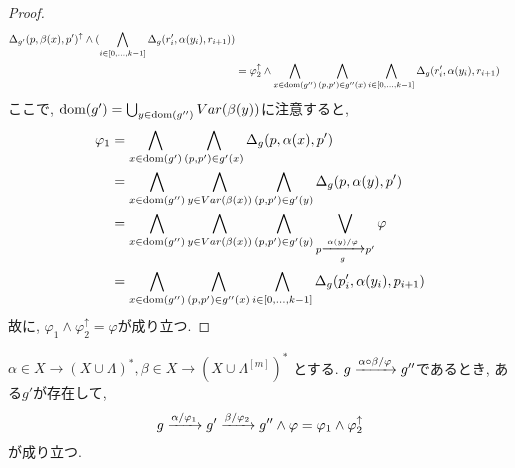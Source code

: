 \documentclass[uplatex,dvipdfmx,a4j]{jsreport}
\begin{document}
\begin{proof}
\begin{align*}
                    \Delta_{g'}(p, \beta(x), p')^\uparrow \land
                    (\bigwedge_{i \in [0, \ldots, k - 1]} \Delta_g(r'_i, \alpha(y_i), r_{i + 1})
                  ) \\
              &= \varphi_2^\uparrow \land
                  \bigwedge_{x \in \scriptsize \dom(g'')} \bigwedge_{(p, p') \in g''(x)}
                    \bigwedge_{i \in [0, \ldots, k - 1]} \Delta_g(r'_i, \alpha(y_i), r_{i + 1})
    \end{align*}
    ここで, $\dom(g') = \bigcup_{y \in \scriptsize \dom(g'')} Var(\beta(y))$に注意すると,
    \begin{align*}
      \varphi_1 &= \bigwedge_{x \in \scriptsize \dom(g')} \bigwedge_{(p, p') \in g'(x)}
                  \Delta_g(p, \alpha(x), p')  \\
                &= \bigwedge_{x \in \scriptsize \dom(g'')} \bigwedge_{y \in Var(\beta(x))}
                  \bigwedge_{(p, p') \in g'(y)} \Delta_g(p, \alpha(y), p')  \\
                &= \bigwedge_{x \in \scriptsize \dom(g'')} \bigwedge_{y \in Var(\beta(x))}
                  \bigwedge_{(p, p') \in g'(y)} \bigvee_{p \transarrow{\alpha(y) / \varphi}{g} p'}
                  \varphi  \\
                &= \bigwedge_{x \in \scriptsize \dom(g'')} \bigwedge_{(p, p') \in g''(x)}
                  \bigwedge_{i \in [0, \ldots, k - 1]} \Delta_g(p'_i, \alpha(y_i), p_{i + 1})
    \end{align*}
    故に, $\varphi_1 \land \varphi_2^\uparrow = \varphi$が成り立つ.
  \end{proof}

  \begin{lemma} \label{relation_over_g_is_associative_left}
    $\alpha \in X \rightarrow (X \cup \Lambda)^*, \beta \in X \rightarrow (X \cup \Lambda^{[m]})^*$
    とする.
    $g \transarrow{\alpha \circ \beta / \varphi}{} g''$であるとき,
    ある$g'$が存在して,
    \[
      g \transarrow{\alpha / \varphi_1}{} g' \transarrow{\beta / \varphi_2}{} g'' \land
      \varphi = \varphi_1 \land \varphi_2^\uparrow
    \]
    が成り立つ.
  \end{lemma}
\end{document}
